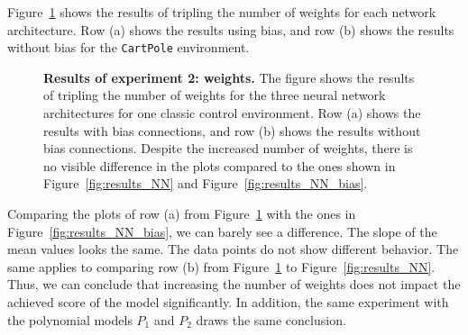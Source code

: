 Figure~\ref{fig:results_NN_weights} shows the results of tripling the number of weights for each network architecture. Row (a) shows the results using bias, and row (b) shows the results without bias for the \verb|CartPole| environment.
\begin{figure}[!ht]
\begin{figrow}
\item \label{row:NN_with_bias_wfactor_3} 
\item \label{row:NN_without_bias_wfactor_3}  
\end{figrow}
\vspace*{-5mm}
\caption[Results of experiment 2: weights]{
  \textbf{Results of experiment 2: weights.}
   The figure shows the results of tripling the number of weights for the three neural network architectures for one classic control environment. Row (a) shows the results with bias connections, and row (b) shows the results without bias connections. Despite the increased number of weights, there is no visible difference in the plots compared to the ones shown in Figure~\ref{fig:results_NN} and Figure~\ref{fig:results_NN_bias}.
}
\label{fig:results_NN_weights}
\end{figure}
Comparing the plots of row (a) from Figure~\ref{fig:results_NN_weights} with the ones in Figure~\ref{fig:results_NN_bias}, we can barely see a difference. The slope of the mean values looks the same. The data points do not show different behavior. The same applies to comparing row (b) from Figure~\ref{fig:results_NN_weights} to Figure~\ref{fig:results_NN}. Thus, we can conclude that increasing the number of weights does not impact the achieved score of the model significantly. In addition, the same experiment with the polynomial models $P_1$ and $P_2$ draws the same conclusion.

